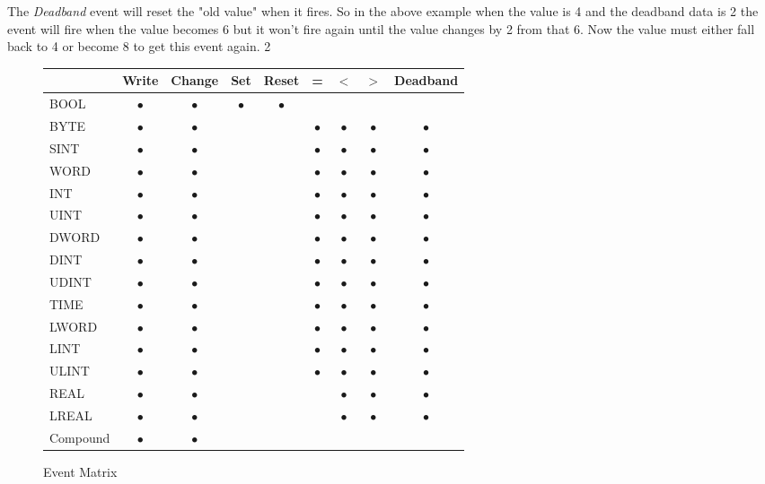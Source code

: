 The \textit{Deadband} event will reset the "old value" when it fires.  So in the above example when the value is 4 and the deadband data is 2 the event will fire when the value becomes 6 but it won't fire again until the value changes by 2 from that 6.  Now the value must either fall back to 4 or become 8 to get this event again.
2
\begin{figure}[h]
\centering
\begin{tabular}{|l|c|c|c|c|c|c|c|c|}
\hline   & Write & Change & Set & Reset & = & $<$ & $>$ & Deadband \\ 
\hline  BOOL & $\bullet$ & $\bullet$ & $\bullet$ & $\bullet$ &  &  &  &  \\ 
\hline  BYTE & $\bullet$ & $\bullet$ &  &  & $\bullet$ & $\bullet$ & $\bullet$ & $\bullet$ \\ 
\hline  SINT & $\bullet$ & $\bullet$ &  &  & $\bullet$ & $\bullet$ & $\bullet$ &$\bullet$  \\ 
\hline  WORD & $\bullet$ & $\bullet$ &  &  & $\bullet$ & $\bullet$ & $\bullet$ & $\bullet$ \\ 
\hline  INT & $\bullet$ & $\bullet$ &  &  & $\bullet$ & $\bullet$ & $\bullet$ & $\bullet$ \\ 
\hline  UINT & $\bullet$ & $\bullet$ &  &  & $\bullet$ & $\bullet$ & $\bullet$ & $\bullet$ \\ 
\hline  DWORD & $\bullet$ & $\bullet$ &  &  & $\bullet$ & $\bullet$ & $\bullet$ & $\bullet$ \\ 
\hline  DINT & $\bullet$ & $\bullet$ &  &  & $\bullet$ & $\bullet$ & $\bullet$ & $\bullet$ \\ 
\hline  UDINT & $\bullet$ & $\bullet$ &  &  & $\bullet$ & $\bullet$ & $\bullet$ & $\bullet$ \\ 
\hline  TIME & $\bullet$ & $\bullet$ &  &  & $\bullet$ & $\bullet$ & $\bullet$ & $\bullet$ \\ 
\hline  LWORD & $\bullet$ & $\bullet$ &  &  & $\bullet$ & $\bullet$ & $\bullet$ & $\bullet$ \\ 
\hline  LINT & $\bullet$ & $\bullet$ &  &  & $\bullet$ & $\bullet$ & $\bullet$ & $\bullet$ \\ 
\hline  ULINT & $\bullet$ & $\bullet$ &  &  & $\bullet$ & $\bullet$ & $\bullet$ & $\bullet$ \\ 
\hline  REAL & $\bullet$ & $\bullet$ &  &  &  & $\bullet$ & $\bullet$ & $\bullet$ \\ 
\hline  LREAL & $\bullet$ & $\bullet$ &  &  &  & $\bullet$ & $\bullet$ & $\bullet$ \\ 
\hline  Compound & $\bullet$ & $\bullet$ &  &  &  &  &  &  \\ 
\hline 
\end{tabular} 
\caption{\label{Event Matrix}Event Matrix}
\end{figure}

